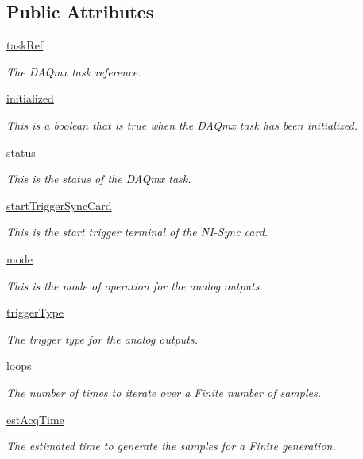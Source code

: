 \subsection*{Public Attributes}
\begin{DoxyCompactItemize}
\item 
\hyperlink{class_analog_output_1_1_analog_output_a9244a764a26db3ca994e95f2e64f650f}{task\-Ref}
\begin{DoxyCompactList}\small\item\em The D\-A\-Qmx task reference. \end{DoxyCompactList}\item 
\hyperlink{class_analog_output_1_1_analog_output_aff699a66c410a728e70631b2e5e621a2}{initialized}
\begin{DoxyCompactList}\small\item\em This is a boolean that is true when the D\-A\-Qmx task has been initialized. \end{DoxyCompactList}\item 
\hyperlink{class_analog_output_1_1_analog_output_a021dd1434ccfaaa5a876ebde88609cb1}{status}
\begin{DoxyCompactList}\small\item\em This is the status of the D\-A\-Qmx task. \end{DoxyCompactList}\item 
\hyperlink{class_analog_output_1_1_analog_output_a7f2d56d4169a65eb67d1f5d3f2c5c87a}{start\-Trigger\-Sync\-Card}
\begin{DoxyCompactList}\small\item\em This is the start trigger terminal of the N\-I-\/\-Sync card. \end{DoxyCompactList}\item 
\hyperlink{class_analog_output_1_1_analog_output_aac2f3b8aa6e295ee91e3671c57c68e47}{mode}
\begin{DoxyCompactList}\small\item\em This is the mode of operation for the analog outputs. \end{DoxyCompactList}\item 
\hyperlink{class_analog_output_1_1_analog_output_a760ab1469dad131efc3a61354dd59db3}{trigger\-Type}
\begin{DoxyCompactList}\small\item\em The trigger type for the analog outputs. \end{DoxyCompactList}\item 
\hyperlink{class_analog_output_1_1_analog_output_a6ef94f02074244f9f6c513fd25208b46}{loops}
\begin{DoxyCompactList}\small\item\em The number of times to iterate over a Finite number of samples. \end{DoxyCompactList}\item 
\hyperlink{class_analog_output_1_1_analog_output_a00b63231e0b6b1fcd479b140616eb573}{est\-Acq\-Time}
\begin{DoxyCompactList}\small\item\em The estimated time to generate the samples for a Finite generation. \end{DoxyCompactList}\end{DoxyCompactItemize}
